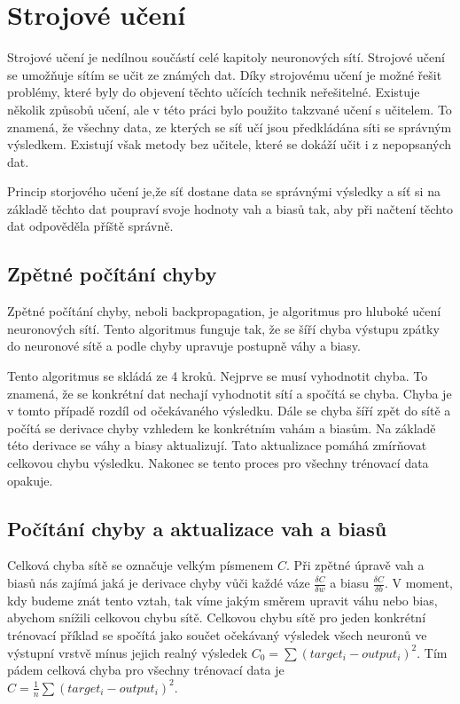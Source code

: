\section{Strojové učení} \label{strojove_uceni}
Strojové učení je nedílnou součástí celé kapitoly neuronových sítí. Strojové učení se umožňuje sítím se učit ze známých dat.
Díky strojovému učení je možné řešit problémy, které byly do objevení těchto učících technik neřešitelné.
Existuje několik způsobů učení, ale v této práci bylo použito takzvané učení s učitelem.
To znamená, že všechny data, ze kterých se síť učí jsou předkládána síti se správným výsledkem.
Existují však metody bez učitele, které se dokáží učit i z nepopsaných dat.

Princip storjového učení je,že síť dostane data se správnými výsledky a síť si na základě těchto dat poupraví svoje hodnoty vah a biasů tak,
aby při načtení těchto dat odpověděla příště správně.

\subsection{Zpětné počítání chyby}
Zpětné počítání chyby\cite{backpropagation}, neboli backpropagation, je algoritmus pro hluboké učení neuronových sítí.
Tento algoritmus funguje tak, že se šíří chyba výstupu zpátky do neuronové sítě a podle chyby upravuje postupně váhy a biasy.

Tento algoritmus se skládá ze 4 kroků. Nejprve se musí vyhodnotit chyba. To znamená, že se konkrétní dat nechají vyhodnotit sítí a spočítá se chyba.
Chyba je v tomto případě rozdíl od očekávaného výsledku. Dále se chyba šíří zpět do sítě a počítá se derivace chyby vzhledem ke konkrétním vahám a biasům.
Na základě této derivace se váhy a biasy aktualizují. Tato aktualizace pomáhá zmírňovat celkovou chybu výsledku. Nakonec se tento proces pro všechny trénovací data opakuje.

\subsection{Počítání chyby a aktualizace vah a biasů}
Celková chyba sítě se označuje velkým písmenem \(C\). Při zpětné úpravě vah a biasů nás zajímá jaká je derivace chyby vůči každé váze \(\frac{\delta C}{\delta w}\) a biasu \(\frac{\delta C}{\delta b}\).
V moment, kdy budeme znát tento vztah, tak víme jakým směrem upravit váhu nebo bias, abychom snížili celkovou chybu sítě.
Celkovou chybu sítě pro jeden konkrétní trénovací příklad se spočítá jako součet očekávaný výsledek všech neuronů ve výstupní vrstvě mínus jejich realný výsledek \(C_0 = \sum (target_i - output_i)^2 \).
Tím pádem celková chyba pro všechny trénovací data je \(C = \frac{1}{n}\sum (target_i - output_i)^2 \).


